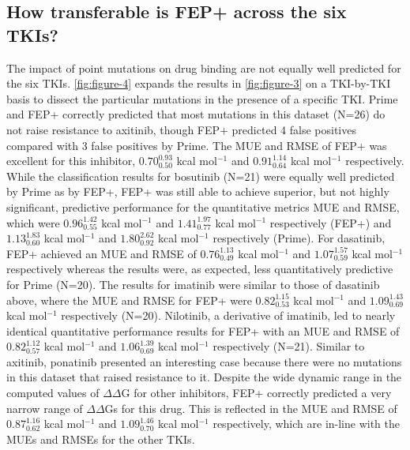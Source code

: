 \documentclass[phd,tocprelim]{cornell}
\renewcommand{\FIG}[1]{\autoref{fig:#1}}
\begin{document}
\subsection{How transferable is FEP+ across the six TKIs?}
The impact of point mutations on drug binding are not equally well predicted for the six TKIs.
\FIG{figure-4} expands the results in \FIG{figure-3} on a TKI-by-TKI basis to dissect the particular mutations in the presence of a specific TKI.
Prime and FEP+ correctly predicted that most mutations in this dataset (N=26) do not raise resistance to axitinib, though FEP+ predicted 4 false positives compared with 3 false positives by Prime. The MUE and RMSE of FEP+ was excellent for this inhibitor, $0.70^{0.93}_{0.50}$ kcal mol$^{-1}$ and $0.91^{1.14}_{0.64}$ kcal mol$^{-1}$ respectively.
While the classification results for bosutinib (N=21) were equally well predicted by Prime as by FEP+, FEP+ was still able to achieve superior, but not highly significant, predictive performance for the quantitative metrics MUE and RMSE, which were $0.96^{1.42}_{0.55}$ kcal mol$^{-1}$ and $1.41^{1.97}_{0.77}$ kcal mol$^{-1}$ respectively (FEP+) and $1.13^{1.83}_{0.60}$ kcal mol$^{-1}$ and $1.80^{2.62}_{0.92}$ kcal mol$^{-1}$ respectively (Prime).
For dasatinib, FEP+ achieved an MUE and RMSE of $0.76^{1.13}_{0.49}$ kcal mol$^{-1}$ and $1.07^{1.57}_{0.59}$ kcal mol$^{-1}$ respectively whereas the results were, as expected, less quantitatively predictive for Prime (N=20).
The results for imatinib were similar to those of dasatinib above, where the MUE and RMSE for FEP+ were $0.82^{1.15}_{0.53}$ kcal mol$^{-1}$ and $1.09^{1.43}_{0.69}$ kcal mol$^{-1}$ respectively (N=20).
Nilotinib, a derivative of imatinib, led to nearly identical quantitative performance results for FEP+ with an MUE and RMSE of $0.82^{1.12}_{0.57}$ kcal mol$^{-1}$ and $1.06^{1.39}_{0.69}$ kcal mol$^{-1}$ respectively (N=21).
Similar to axitinib, ponatinib presented an interesting case because there were no mutations in this dataset that raised resistance to it.
Despite the wide dynamic range in the computed values of $\Delta\Delta$G for other inhibitors, FEP+ correctly predicted a very narrow range of $\Delta\Delta$Gs for this drug. 
This is reflected in the MUE and RMSE of $0.87^{1.16}_{0.62}$ kcal mol$^{-1}$ and $1.09^{1.46}_{0.70}$ kcal mol$^{-1}$ respectively, which are in-line with the MUEs and RMSEs for the other TKIs.
\end{document}
